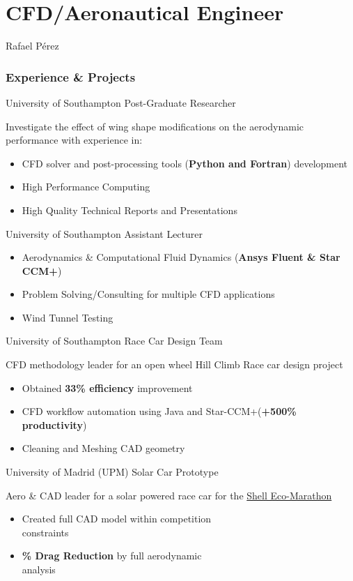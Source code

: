 \documentclass[fontsize=10pt]{tccv}
\begin{document}
\part{CFD/Aeronautical Engineer}{Rafael P\'erez}

\section{Experience \& Projects}
\begin{eventlist}
     {University of Southampton}
     {Post-Graduate Researcher}

Investigate the effect of wing shape modifications on
the aerodynamic performance with experience in:
\begin{itemize}
	\itemsep -1pt
	\item CFD solver and post-processing tools (\textbf{Python and Fortran}) development
	\item High Performance Computing
	\item High Quality Technical Reports and Presentations
\end{itemize}

	{University of Southampton}
	{Assistant Lecturer}
\begin{itemize}
	\itemsep -1pt
	\item Aerodynamics \& Computational Fluid Dynamics (\textbf{Ansys Fluent \& Star
	CCM+})
	\item Problem Solving/Consulting for multiple CFD applications
	\item Wind Tunnel Testing
\end{itemize}

     {University of Southampton}
     {Race Car Design Team}

CFD methodology leader for an open wheel Hill Climb Race car design project
     \begin{itemize}
	\itemsep -1pt
     	\item Obtained \textbf{33\% efficiency} improvement
     	\item CFD workflow automation using Java and Star-CCM+(\textbf{+500\% productivity})
	\item Cleaning and Meshing CAD geometry
     \end{itemize}

     {University of Madrid (UPM)}
     {Solar Car Prototype}

Aero \& CAD leader for a solar powered race car for the \href{http://www.shell.com/global/environment-society/ecomarathon.html}{Shell Eco-Marathon}
\begin{itemize}
\itemsep -1pt
	\item Created full CAD model within competition \\constraints
	\item \textbf{\% Drag Reduction} by full aerodynamic \\analysis
\end{itemize}
\end{eventlist}
\end{document}
